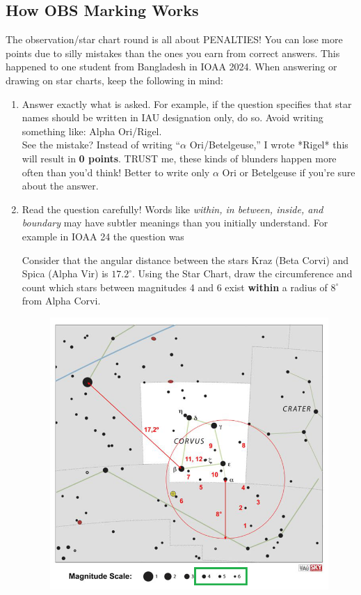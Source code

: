 \documentclass[a4paper,12pt]{extarticle}
\begin{document}
\subsection{How OBS Marking Works}

The observation/star chart round is all about {\color{red}PENALTIES}! You can lose more points due to silly mistakes than the ones you earn from correct answers. This happened to one student from Bangladesh in IOAA 2024. When answering or drawing on star charts, keep the following in mind:

\begin{enumerate}
	\item \textsf{Answer exactly what is asked.} For example, if the question specifies that star names should be written in IAU designation only, do so. Avoid writing something like: Alpha Ori/Rigel. \\
	
	See the mistake? Instead of writing “$\alpha$ Ori/Betelgeuse,” I wrote *Rigel* this will result in \textbf{0 points}. TRUST me, these kinds of blunders happen more often than you’d think! Better to write only $\alpha$ Ori or Betelgeuse if you're sure about the answer.
	\item \textsf{Read the question carefully!} Words like \textit{within, in between, inside, and boundary} may have subtler meanings than you initially understand. For example in IOAA 24 the question was

\begin{pro}
	Consider that the angular distance between the stars Kraz (Beta Corvi) and Spica (Alpha Vir) is $17.2^\circ$.
	Using the Star Chart, draw the circumference and count which
	stars between magnitudes 4 and 6 exist \textbf{within} a radius of $8^\circ$ from Alpha Corvi.
\end{pro}
\begin{sol}
	\begin{figure}[H]
		\centering
		\includegraphics[width=0.8\linewidth]{ioaa_24mag.png}
	\end{figure}
\end{sol}
	

\end{enumerate}
\end{document}
